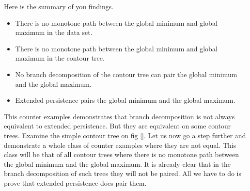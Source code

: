 Here is the summary of you findings.

\begin{itemize}
    \item There is no monotone path between the global minimum and global maximum in the data set.
    \item There is no monotone path between the global minimum and global maximum in the contour tree.
    \item No branch decomposition of the contour tree can pair the global minimum and the global maximum.
    \item Extended persistence pairs the global minimum and the global maximum.
\end{itemize}

This counter examples demonstrates that branch decomposition is not always equivalent to extended persistence. But they are equivalent on some contour trees. Examine the simple contour tree on fig []. Let us now go a step further and demonstrate a whole class of counter examples where they are not equal. This class will be that of all contour trees where there is no monotone path between the global minimum and the global maximum. It is already clear that in the branch decomposition of such trees they will not be paired. All we have to do is prove that extended persistence does pair them.



